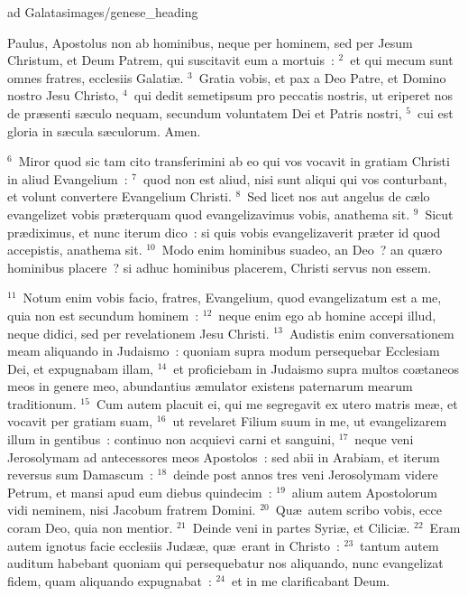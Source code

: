 {ad Galatas}{images/genese_heading}


\bchapter
\lettrine[lines=6,image=true,loversize=0.05,lraise=-0.03]{P}{}aulus, Apostolus non ab hominibus, neque per hominem, sed per Jesum Christum, et Deum Patrem, qui suscitavit eum a mortuis~:
${}^{2}$~et qui mecum sunt omnes fratres, ecclesiis Galati\ae .
${}^{3}$~Gratia vobis, et pax a Deo Patre, et Domino nostro Jesu Christo,
${}^{4}$~qui dedit semetipsum pro peccatis nostris, ut eriperet nos de pr\ae senti s\ae culo nequam, secundum voluntatem Dei et Patris nostri,
${}^{5}$~cui est gloria in s\ae cula s\ae culorum. Amen.


${}^{6}$~Miror quod sic tam cito transferimini ab eo qui vos vocavit in gratiam Christi in aliud Evangelium~:
${}^{7}$~quod non est aliud, nisi sunt aliqui qui vos conturbant, et volunt convertere Evangelium Christi.
${}^{8}$~Sed licet nos aut angelus de c\ae lo evangelizet vobis pr\ae terquam quod evangelizavimus vobis, anathema sit.
${}^{9}$~Sicut pr\ae diximus, et nunc iterum dico~: si quis vobis evangelizaverit pr\ae ter id quod accepistis, anathema sit.
${}^{10}$~Modo enim hominibus suadeo, an Deo~? an qu\ae ro hominibus placere~? si adhuc hominibus placerem, Christi servus non essem.


${}^{11}$~Notum enim vobis facio, fratres, Evangelium, quod evangelizatum est a me, quia non est secundum hominem~:
${}^{12}$~neque enim ego ab homine accepi illud, neque didici, sed per revelationem Jesu Christi.
${}^{13}$~Audistis enim conversationem meam aliquando in Judaismo~: quoniam supra modum persequebar Ecclesiam Dei, et expugnabam illam,
${}^{14}$~et proficiebam in Judaismo supra multos co\ae taneos meos in genere meo, abundantius \ae mulator existens paternarum mearum traditionum.
${}^{15}$~Cum autem placuit ei, qui me segregavit ex utero matris me\ae , et vocavit per gratiam suam,
${}^{16}$~ut revelaret Filium suum in me, ut evangelizarem illum in gentibus~: continuo non acquievi carni et sanguini,
${}^{17}$~neque veni Jerosolymam ad antecessores meos Apostolos~: sed abii in Arabiam, et iterum reversus sum Damascum~:
${}^{18}$~deinde post annos tres veni Jerosolymam videre Petrum, et mansi apud eum diebus quindecim~:
${}^{19}$~alium autem Apostolorum vidi neminem, nisi Jacobum fratrem Domini.
${}^{20}$~Qu\ae\ autem scribo vobis, ecce coram Deo, quia non mentior.
${}^{21}$~Deinde veni in partes Syri\ae , et Cilici\ae .
${}^{22}$~Eram autem ignotus facie ecclesiis Jud\ae \ae , qu\ae\ erant in Christo~:
${}^{23}$~tantum autem auditum habebant quoniam qui persequebatur nos aliquando, nunc evangelizat fidem, quam aliquando expugnabat~:
${}^{24}$~et in me clarificabant Deum.

